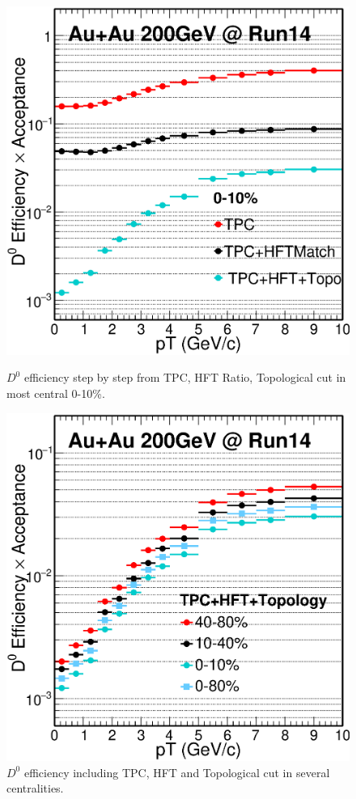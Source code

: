 \documentclass[a4paper]{article}
\begin{document}
\begin{figure}[htbp]
\begin{minipage}[htbp]{0.52\linewidth}
\centering
\includegraphics[width=1.0\textwidth,angle=0]{fig/HFT_efficiencyCombineStepbyStep_2.eps}
\caption{ $D^0$ efficiency step by step from TPC, HFT Ratio, Topological cut in most central 0-10\%. \label{D0effStep}}
\end{minipage}
\hfill
\begin{minipage}[htbp]{0.52\linewidth}
\centering
\includegraphics[width=1.0\textwidth,angle=0]{fig/HFT_efficiencyCombineCompare_5.eps} 
\caption{ $D^0$ efficiency including TPC, HFT and Topological cut in several centralities. \label{D0effCombine}}
\end{minipage}
\end{figure}
\end{document}
